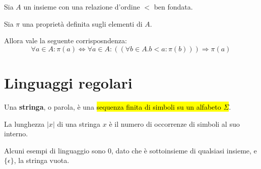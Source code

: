 \documentclass[a4paper, 12pt]{book}
\begin{document}
    \begin{tcolorbox}[
      colback=cyan!5!white,
      colframe=blue!50!black,
      title=\textbf{Definizione - induzione matematica},
      coltitle=white,
      fonttitle=\bfseries,
      arc=3mm,
      boxrule=0.5pt,
      enhanced,
      breakable
    ]
      Sia $A$ un insieme con una relazione d'ordine $<$ ben fondata.

      \vspace{1mm}

      Sia $\pi$ una proprietà definita sugli elementi di $A$.

      \vspace{1mm}

      Allora vale la seguente corrisposndenza:
      \begin{equation*}
        \forall a \in A: \pi(a) \Leftrightarrow \forall a \in A: ((\forall b \in A.b < a: \pi(b))) \Rightarrow \pi(a)
      \end{equation*}
    \end{tcolorbox}


    \chapter*{Linguaggi regolari}

    \begin{tcolorbox}[
      colback=cyan!5!white,
      colframe=blue!50!black,
      title=\textbf{Definizione - stringa},
      coltitle=white,
      fonttitle=\bfseries,
      arc=3mm,
      boxrule=0.5pt,
      enhanced,
      breakable
    ]
      Una \textbf{stringa}, o parola, è una \hl{sequenza finita di simboli su un alfabeto $\Sigma$}.
    \end{tcolorbox}

    \vspace{3mm}

    \begin{tcolorbox}[
      colback=cyan!5!white,
      colframe=blue!50!black,
      title=\textbf{Definizione - lunghezza di una stringa},
      coltitle=white,
      fonttitle=\bfseries,
      arc=3mm,
      boxrule=0.5pt,
      enhanced,
      breakable
    ]
      La lunghezza $|x|$ di una stringa $x$ è il numero di occorrenze di simboli al suo interno.
    \end{tcolorbox}

    Alcuni esempi di linguaggio sono $0$, dato che è sottoinsieme di qualsiasi insieme, e $\{\epsilon\}$, la stringa vuota.
\end{document}
